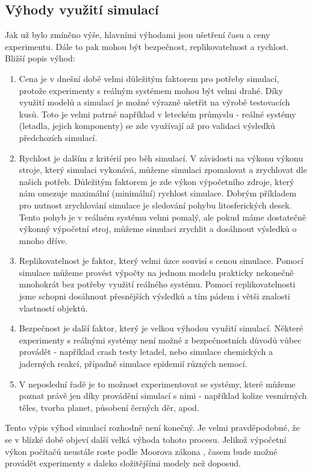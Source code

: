 \subsection{Výhody využití simulací}
\label{vyhody}
Jak už bylo zmíněno výše, hlavními výhodami jsou ušetření času a ceny experimentu. Dále to pak mohou být bezpečnost, replikovatelnost a rychlost. Bližší popis výhod:

\begin{enumerate}
    \item Cena je v dnešní době velmi důležitým faktorem pro potřeby simulací, protože experimenty s reálným systémem mohou být velmi drahé. Díky využití modelů a simulací je možné výrazně ušetřit na výrobě testovacích kusů. Toto je velmi patrné například v leteckém průmyslu - reálné systémy (letadla, jejich komponenty) se zde využívají až pro validaci výsledků předchozích simulací. 
    \item Rychlost je dalším z kritérií pro běh simulací. V závislosti na výkonu výkonu stroje, který simulaci vykonává, můžeme simulaci zpomalovat a zrychlovat dle našich potřeb. Důležitým faktorem je zde výkon výpočetního zdroje, který nám omezuje maximální (minimální) rychlost simulace. Dobrým příkladem pro nutnost zrychlování simulace je sledování pohybu litosferických desek. Tento pohyb je v reálném systému velmi pomalý, ale pokud máme dostatečně výkonný výpočetní stroj, můžeme simulaci zrychlit a dosáhnout výsledků o mnoho dříve. 
    \item Replikovatelnost je faktor, který velmi úzce souvisí s cenou simulace. Pomocí simulace můžeme provést výpočty na jednom modelu prakticky nekonečně mnohokrát bez potřeby využití reálného systému. Pomocí replikovatelnosti jsme schopni dosáhnout přesnějších výsledků a tím pádem i větši znalosti vlastností objektů.
    \item Bezpečnost je další faktor, který je velkou výhodou využití simulací. Některé experimenty s reálnými systémy není možné z bezpečnostních důvodů vůbec provádět - například crash testy letadel, nebo simulace chemických a jaderných reakcí, případně simulace epidemií různých nemocí.
    \item V neposlední řadě je to možnost experimentovat se systémy, které můžeme poznat právě jen díky provádění simulací s nimi - například kolize vesmírných těles, tvorba planet, působení černých děr, apod.
\end{enumerate}

Tento výpis výhod simulací rozhodně není konečný. Je velmi pravděpodobné, že se v blízké době objeví další velká výhoda tohoto procesu. Jelikož výpočetní výkon počítačů neustále roste podle Moorova zákona \cite{Schaller1997}, časem bude možné provádět experimenty s daleko složitějšími modely než doposud. 

